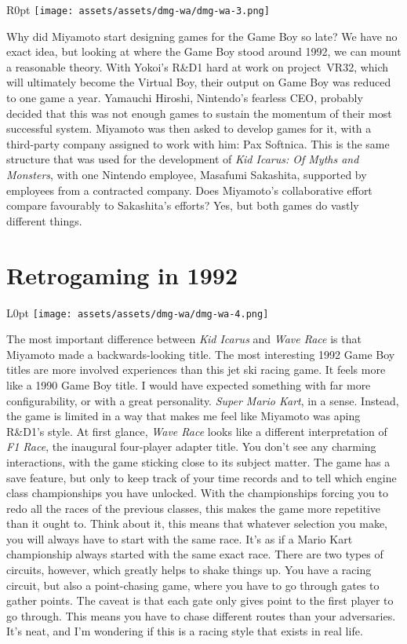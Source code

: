 \documentclass{book}
\begin{document}
\begin{wrapfigure}{R}{0pt} \texttt{[image: assets/assets/dmg-wa/dmg-wa-3.png]}\end{wrapfigure}
Why did Miyamoto start designing games for the Game Boy so late? We have no exact idea, but looking at where the Game Boy stood around 1992, we can mount a reasonable theory. With Yokoi’s R\&D1 hard at work on project VR32, which will ultimately become the Virtual Boy, their output on Game Boy was reduced to one game a year. Yamauchi Hiroshi, Nintendo’s fearless CEO, probably decided that this was not enough games to sustain the momentum of their most successful system. Miyamoto was then asked to develop games for it, with a third-party company assigned to work with him: Pax Softnica. This is the same structure that was used for the development of \emph{Kid Icarus: Of Myths and Monsters}, with one Nintendo employee, Masafumi Sakashita, supported by employees from a contracted company. Does Miyamoto’s collaborative effort compare favourably to Sakashita’s efforts? Yes, but both games do vastly different things.

\FloatBarrier\needspace{5pt}\section*{Retrogaming in 1992}\nopagebreak[4]

\begin{wrapfigure}{L}{0pt} \texttt{[image: assets/assets/dmg-wa/dmg-wa-4.png]}\end{wrapfigure}
The most important difference between \emph{Kid Icarus} and \emph{Wave Race} is that Miyamoto made a backwards-looking title. The most interesting 1992 Game Boy titles are more involved experiences than this jet ski racing game. It feels more like a 1990 Game Boy title. I would have expected something with far more configurability, or with a great personality. \emph{Super Mario Kart}, in a sense. Instead, the game is limited in a way that makes me feel like Miyamoto was aping R\&D1’s style. At first glance, \emph{Wave Race} looks like a different interpretation of \emph{F1 Race}, the inaugural four-player adapter title. You don’t see any charming interactions, with the game sticking close to its subject matter. The game has a save feature, but only to keep track of your time records and to tell which engine class championships you have unlocked. With the championships forcing you to redo all the races of the previous classes, this makes the game more repetitive than it ought to. Think about it, this means that whatever selection you make, you will always have to start with the same race. It’s as if a Mario Kart championship always started with the same exact race. There are two types of circuits, however, which greatly helps to shake things up. You have a racing circuit, but also a point-chasing game, where you have to go through gates to gather points. The caveat is that each gate only gives point to the first player to go through. This means you have to chase different routes than your adversaries. It’s neat, and I’m wondering if this is a racing style that exists in real life.
\end{document}
